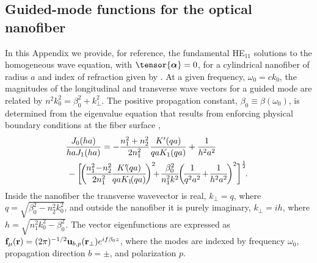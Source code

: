 \documentclass[aps,pra,twocolumn]{revtex4-1} %
\begin{document}
\begin{appendix}	


\section{Guided-mode functions for the optical nanofiber} \label{Appendix::ModeFunctions}

  

In this Appendix we provide, for reference, the fundamental HE$_{11}$ solutions to the homogeneous wave equation,  with $\tensor{\boldsymbol{\alpha}} = 0$, for a cylindrical nanofiber of radius $a$ and index of refraction given by .  At a given frequency, $\omega_0 = c k_0$, the magnitudes of the longitudinal and transverse wave vectors for a guided mode are related by $n^2 k_0^2 = \beta_0^2 + k_\perp^2$.  
The positive propagation constant, $\beta_0 \equiv \beta(\omega_0)$, is determined from the eigenvalue equation that results from enforcing physical boundary conditions at the fiber surface \cite{snyder_optical_1983},
	\begin{align}
		\!\!\!& \frac{J_0(ha)}{ha J_1(ha)} = - \frac{n_1^2+n_2^2}{2n_1^2} \frac{K'(qa)}{qa K_1(qa)} + \frac{1}{h^2 a^2} \nn\\
		\!\!\!\!\!\!\!\!&\, - \bigg[\! \bigg(\!\frac{n_1^2 \!-\! n_2^2}{2 n_1^2}\! \frac{K'\!(qa)}{qa K_1\!(qa)} \!\bigg)^2  \!\!\!+\! \frac{\beta_0^2}{n^2_1 k^2}\!\! \left(\!\frac{1}{q^2a^2} \!+\! \frac{1}{h^2a^2}\! \right)^2\! \bigg]^{\frac{1}{2}}\!.
	\end{align}
Inside the nanofiber the transverse wavevector is real, $k_\perp = q$, where $q=\sqrt{\beta_0^2- n_2^2k_0^2}$, and outside the nanofiber it is purely imaginary, $k_\perp = i h$, where $h=\sqrt{n_1^2 k_0^2 - \beta_0^2}$.  The vector eigenfunctions are expressed as $\mathbf{f}_{\mu}(\mathbf{r}) = (2\pi)^{-1/2}\mathbf{u}_{b,p}(\mathbf{r}_\perp) e^{i f \beta_0 z}$, where the modes are indexed by frequency $\omega_0$, propagation direction $b = \pm$, and polarization $p$.


\end{appendix}
\end{document}
